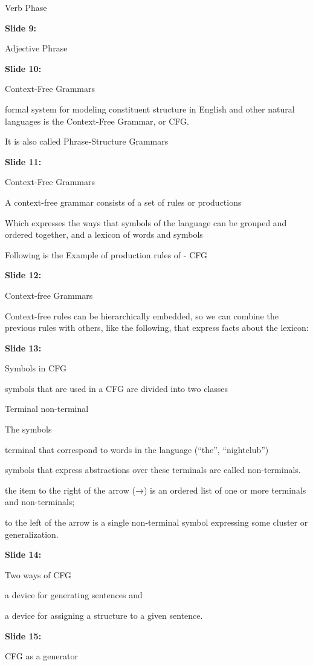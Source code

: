 \documentclass[11pt,a4paper]{article}
\begin{document}
Verb Phase

\textbf{Slide 9:}

Adjective Phrase

\textbf{Slide 10:}

Context-Free Grammars

formal system for modeling constituent structure in English and other natural languages is the Context-Free Grammar, or CFG.

It is also called Phrase-Structure Grammars

\textbf{Slide 11:}

Context-Free Grammars

A context-free grammar consists of a set of rules or productions

Which expresses the ways that symbols of the language can be grouped and ordered together, and a lexicon of words and symbols

Following is the Example of production rules of - CFG

\textbf{Slide 12:}

Context-free Grammars

Context-free rules can be hierarchically embedded, so we can combine the previous rules with others, like the following, that express facts about the lexicon:

\textbf{Slide 13:}

Symbols in CFG

symbols that are used in a CFG are divided into two classes

Terminal                                    non-terminal

The symbols

terminal that correspond to words in the language (“the”, “nightclub”)

symbols that express abstractions over these terminals are called non-terminals.

the item to the right of the arrow (→) is an ordered list of one or more terminals and non-terminals;

to the left of the arrow is a single non-terminal symbol expressing some cluster or generalization.

\textbf{Slide 14:}

Two ways of CFG

a device for generating sentences and

a device for assigning a structure to a given sentence.

\textbf{Slide 15:}

CFG as a generator
\end{document}
